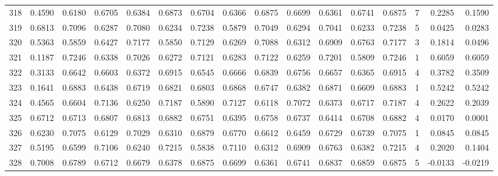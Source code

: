 \begin{tabular}{lrrrrrrrrrrrrrrr}
318 &      0.4590 &  0.6180 &  0.6705 &  0.6384 &  0.6873 &  0.6704 &  0.6366 &  0.6875 &  0.6699 &  0.6361 &   0.6741 &     0.6875 &      7 &                    0.2285 &                     0.1590 \\
319 &      0.6813 &  0.7096 &  0.6287 &  0.7080 &  0.6234 &  0.7238 &  0.5879 &  0.7049 &  0.6294 &  0.7041 &   0.6233 &     0.7238 &      5 &                    0.0425 &                     0.0283 \\
320 &      0.5363 &  0.5859 &  0.6427 &  0.7177 &  0.5850 &  0.7129 &  0.6269 &  0.7088 &  0.6312 &  0.6909 &   0.6763 &     0.7177 &      3 &                    0.1814 &                     0.0496 \\
321 &      0.1187 &  0.7246 &  0.6338 &  0.7026 &  0.6272 &  0.7121 &  0.6283 &  0.7122 &  0.6259 &  0.7201 &   0.5809 &     0.7246 &      1 &                    0.6059 &                     0.6059 \\
322 &      0.3133 &  0.6642 &  0.6603 &  0.6372 &  0.6915 &  0.6545 &  0.6666 &  0.6839 &  0.6756 &  0.6657 &   0.6365 &     0.6915 &      4 &                    0.3782 &                     0.3509 \\
323 &      0.1641 &  0.6883 &  0.6438 &  0.6719 &  0.6821 &  0.6803 &  0.6868 &  0.6747 &  0.6382 &  0.6871 &   0.6609 &     0.6883 &      1 &                    0.5242 &                     0.5242 \\
324 &      0.4565 &  0.6604 &  0.7136 &  0.6250 &  0.7187 &  0.5890 &  0.7127 &  0.6118 &  0.7072 &  0.6373 &   0.6717 &     0.7187 &      4 &                    0.2622 &                     0.2039 \\
325 &      0.6712 &  0.6713 &  0.6807 &  0.6813 &  0.6882 &  0.6751 &  0.6395 &  0.6758 &  0.6737 &  0.6414 &   0.6708 &     0.6882 &      4 &                    0.0170 &                     0.0001 \\
326 &      0.6230 &  0.7075 &  0.6129 &  0.7029 &  0.6310 &  0.6879 &  0.6770 &  0.6612 &  0.6459 &  0.6729 &   0.6739 &     0.7075 &      1 &                    0.0845 &                     0.0845 \\
327 &      0.5195 &  0.6599 &  0.7106 &  0.6240 &  0.7215 &  0.5838 &  0.7110 &  0.6312 &  0.6909 &  0.6763 &   0.6382 &     0.7215 &      4 &                    0.2020 &                     0.1404 \\
328 &      0.7008 &  0.6789 &  0.6712 &  0.6679 &  0.6378 &  0.6875 &  0.6699 &  0.6361 &  0.6741 &  0.6837 &   0.6859 &     0.6875 &      5 &                   -0.0133 &                    -0.0219 \\

\end{tabular}
